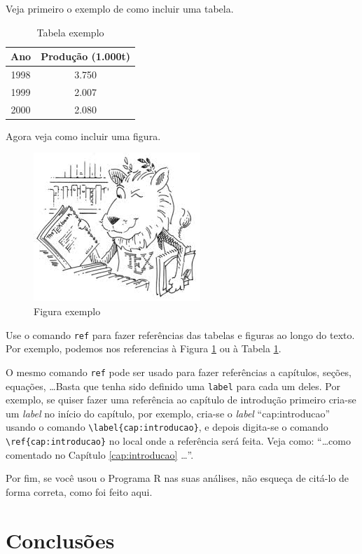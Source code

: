 \documentclass[12pt,a4paper,header]{abnt}
\begin{document}
Veja primeiro o exemplo de como incluir uma tabela. 

\begin{table}[h!]
\centering
\caption{Tabela exemplo} \label{fig:exemplo}
\begin{tabular}{cc}
\hline
Ano & Produção (1.000t)\\
\hline
1998 & 3.750\\
1999 & 2.007\\
2000 & 2.080\\
\hline
\end{tabular}
\end{table}

Agora veja como incluir uma figura. 
 
\begin{figure}[ht!]
\centering
\includegraphics[width=0.4\linewidth]{mascote.jpg}
\caption{Figura exemplo} \label{tab:exemplo}
\end{figure}

Use o comando \verb|ref| para fazer referências das tabelas e figuras ao longo do texto. Por exemplo, podemos nos referencias à Figura \ref{fig:exemplo} ou à Tabela \ref{tab:exemplo}.

O mesmo comando \verb|ref| pode ser usado para fazer referências a capítulos, seções, equações, \ldots Basta que tenha sido definido uma \verb|label| para cada um deles. Por exemplo, se quiser fazer uma referência ao capítulo de introdução primeiro cria-se um \textit{label} no início do capítulo, por exemplo, cria-se o \textit{label} ``cap:introducao'' usando o comando \verb|\label{cap:introducao}|, e depois digita-se o comando  
\verb|\ref{cap:introducao}| no local onde a referência será feita. Veja como: ``\ldots como comentado no Capítulo \ref{cap:introducao} \ldots''.



Por fim, se você usou o Programa R \cite{R} nas suas análises, não esqueça de citá-lo de forma correta, como foi feito aqui. 

\chapter{Conclusões}
\end{document}
